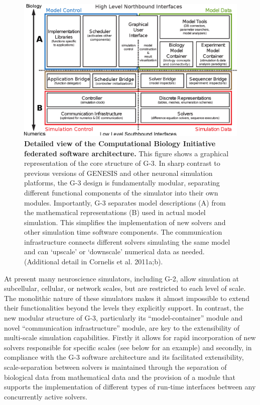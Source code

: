 \documentclass[12pt]{article}
\begin{document}
\begin{figure}
\includegraphics[scale=0.56]{figures/cbi-architecture-expanded.eps}
\caption{\footnotesize {\bf Detailed view of the Computational Biology Initiative
    federated software architecture.}  This figure shows a graphical
  representation of the core structure of G-3. In sharp contrast to
  previous versions of GENESIS and other neuronal simulation
  platforms, the G-3 design is fundamentally modular, separating
  different functional components of the simulator into their own
  modules. Importantly, G-3 separates model descriptions (A) from the
  mathematical representations (B) used in actual model simulation. This
  simplifies the implementation of new solvers and other
  simulation time software components. The communication infrastructure
  connects different solvers simulating the same model and can
  `upscale' or `downscale' numerical data as needed. (Additional
  detail in Cornelis et al. 2011a;b).}
\label{fig:cbi-architecture-expanded}
\end{figure}

At present many neuroscience simulators, including G-2, allow
simulation at subcellular, cellular, or network scales, but are
restricted to each level of scale.  The monolithic nature of these
simulators makes it almost impossible to extend their functionalities
beyond the levels they explicitly support.  In contrast, the new
modular structure of G-3, particularly its ``model-container'' module
and novel ``communication infrastructure'' module, are key to the
extensibility of multi-scale simulation capabilities.  Firstly it
allows for rapid incorporation of new solvers responsible for specific
scales (see below for an example) and secondly, in compliance with the
G-3 software architecture and its facilitated extensibility,
scale-separation between solvers is maintained through the separation
of biological data from mathematical data and the provision of a
module that supports the implementation of different types of run-time
interfaces between any concurrently active solvers.
\end{document}
